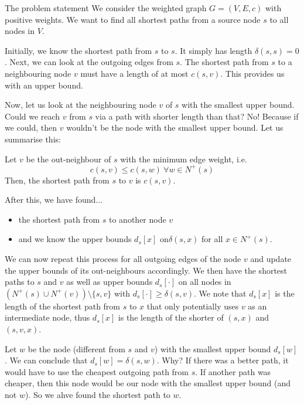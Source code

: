 \documentclass[12pt]{article}
\begin{document}
\begin{notebox}{The problem statement}{}
    We consider the weighted graph $G = (V, E, c)$ with positive weights. We want to find all shortest paths from a source node $s$ to all nodes in $V$.
\end{notebox}

Initially, we know the shortest path from $s$ to $s$. It simply has length $\delta(s, s) = 0$. Next, we can look at the outgoing edges from $s$. The shortest path from $s$ to a neighbouring node $v$ must have a length of at most $c(s, v)$. This provides us with an upper bound.

Now, let us look at the neighbouring node $v$ of $s$ with the smallest upper bound. Could we reach $v$ from $s$ via a path with shorter length than that? No! Because if we could, then $v$ wouldn't be the node with the smallest upper bound. Let us summarise this:

\begin{remark}{}{}
    Let $v$ be the out-neighbour of $s$ with the minimum edge weight, i.e.
    $$
        c(s, v) \leq c(s, w) \ \forall w \in N^+(s)
    $$
    Then, the shortest path from $s$ to $v$ is $c(s, v)$.
\end{remark}

After this, we have found...
\begin{itemize}
    \item the shortest path from $s$ to another node $v$
    \item and we know the upper bounds $d_s[x]$ on$ \delta(s, x)$ for all $x \in N^+(s)$.
\end{itemize}

We can now repeat this process for all outgoing edges of the node $v$ and update the upper bounds of its out-neighbours accordingly. We then have the shortest paths to $s$ and $v$ as well as upper bounds $d_s[\cdot]$ on all nodes in $(N^+(s) \cup N^+(v)) \setminus \{s, v\} $ with $d_s[\cdot] \geq \delta(s, v)$. We note that $d_s[x]$ is the length of the shortest path from $s$ to $x$ that only potentially uses $v$ as an intermediate node, thus $d_s[x]$ is the length of the shorter of $(s, x)$ and $(s, v, x)$.

Let $w$ be the node (different from $s$ and $v$) with the smallest upper bound $d_s[w]$. We can conclude that $d_s[w] = \delta(s, w)$. Why? If there was a better path, it would have to use the cheapest outgoing path from $s$. If another path was cheaper, then this node would be our node with the smallest upper bound (and not $w$). So we ahve found the shortest path to $w$.
\end{document}

